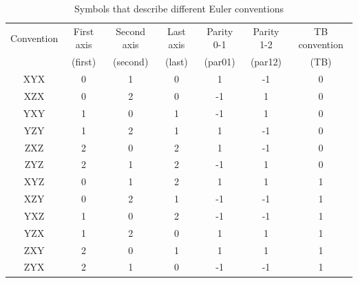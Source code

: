 \documentclass[prb]{revtex4}%
\begin{document}
\begin{table}[h]
\begin{center}
\begin{tabular}{ccccccc}
  \hline
  Convention & First axis & Second axis & Last axis & Parity 0-1 & Parity 1-2 & TB convention  \\
  & (first) & (second) & (last) & (par01) & (par12) & (TB)\\\hline
  XYX & 0 & 1 & 0 & 1 & -1 & 0 \\
  XZX & 0 & 2 & 0 & -1 & 1 & 0 \\
  YXY & 1 & 0 & 1 & -1 & 1 & 0 \\
  YZY & 1 & 2 & 1 & 1 & -1 & 0 \\
  ZXZ & 2 & 0 & 2 & 1 & -1 & 0 \\
  ZYZ & 2 & 1 & 2 & -1 & 1 & 0 \\
  XYZ & 0 & 1 & 2 & 1 & 1 & 1 \\
  XZY & 0 & 2 & 1 & -1 & -1 & 1 \\
  YXZ & 1 & 0 & 2 & -1 & -1 & 1 \\
  YZX & 1 & 2 & 0 & 1 & 1 & 1 \\
  ZXY & 2 & 0 & 1 & 1 & 1 & 1 \\
  ZYX & 2 & 1 & 0 & -1 & -1 & 1 \\
  \hline
\end{tabular}
\caption{\label{conventions}Symbols that describe different Euler conventions}
\end{center}
\vspace{-0.6cm}
\end{table}
\end{document}
